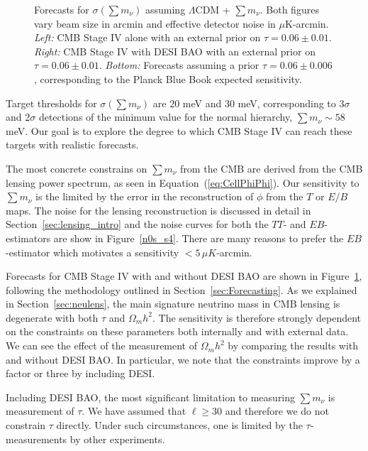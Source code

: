 \begin{figure}[h!]
\begin{center}
\caption{ Forecasts for $\sigma(\sum m_\nu)$ assuming $\Lambda$CDM + $\sum m_\nu$.  Both figures vary beam size in arcmin and effective detector noise in $\mu$K-arcmin. {\it Left:} CMB Stage IV alone with an external prior on $\tau = 0.06 \pm 0.01$. {\it Right: } CMB Stage IV with DESI BAO  with an external prior on $\tau = 0.06 \pm 0.01$.  {\it Bottom:} Forecasts assuming a prior $\tau = 0.06 \pm 0.006$, corresponding to the Planck Blue Book expected sensitivity.}
\label{fig:mnuforecast}
\end{center}
\end{figure} 

Target thresholds for $\sigma(\sum m_\nu)$ are $20$ meV and $30$ meV, corresponding to 3$\sigma$ and 2$\sigma$ detections of the minimum value for the normal hierarchy, $\sum m_\nu \sim 58$ meV.  Our goal is to explore the degree to which CMB Stage IV can reach these targets with realistic forecasts.  

The most concrete constrains on $\sum m_\nu$ from the CMB are derived from the CMB lensing power spectrum, as seen in Equation~(\ref{eq:CellPhiPhi}).  Our sensitivity to $\sum m_\nu$ is the limited by the error in the reconstruction of $\phi$ from the $T$ or $E/B$ maps.  The noise for the lensing reconstruction is discussed in detail in Section~\ref{sec:lensing_intro} and the noise curves for both the $TT$- and $EB$-estimators are show in Figure~\ref{n0s_s4}.  There are many reasons to prefer the $EB$-estimator which motivates a sensitivity $< 5 \, \mu K$-arcmin.  


 

Forecasts for CMB Stage IV with and without DESI BAO are shown in Figure~\ref{fig:mnuforecast}, following the methodology outlined in Section~\ref{sec:Forecasting}.  As we explained in Section~\ref{sec:neulens}, the main signature neutrino mass in CMB lensing is degenerate with both $\tau$ and $\Omega_m h^2$.  The sensitivity is therefore strongly dependent on the constraints on these parameters both internally and with external data.  We can see the effect of the measurement of $\Omega_m h^2$ by comparing the results with and without DESI BAO.  In particular, we note that the constraints improve by a factor or three by including DESI.

Including DESI BAO, the most significant limitation to measuring $\sum m_\nu$ is measurement of $\tau$.  We have assumed that $\ell \geq 30$ and therefore we do not constrain $\tau$ directly.  Under such circumstances, one is limited by the $\tau$-measurements by other experiments.  

